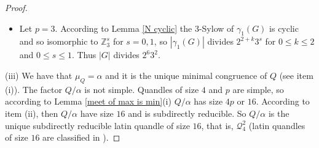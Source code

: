 \documentclass[a4paper, english, 9pt]{amsart}
\theoremstyle{plain}
\newtheorem{proposition}[theorem]{Proposition}
\theoremstyle{definition}
\def\dis{\mathrm{Dis}}
\def\con{\mathrm{Con}}
\def\comment#1{{\color{red} #1}}
\def\Q{\mathcal{Q}_{\mathrm{Hom}}}
\def\Z{\mathbb Z}
\def\Q{\mathcal Q}
\def\LSS{\mathcal{LSS}}
\begin{document}
\begin{proof}
\begin{itemize}
\item Let $p=3$. According to Lemma \ref{N cyclic} the $3$-Sylow of $\gamma_1(G)$ is cyclic and so isomorphic to $\Z_3^s$ for $s=0,1$, so $|\gamma_1(G)|$ divides $2^{2+k}3^s$ for $0\leq k\leq 2$ and $0\leq s\leq 1$. Thus $|G|$ divides $2^{6}3^2$.
\end{itemize}


(iii) We have that $\mu_Q=\alpha$ and it is the unique minimal congruence of $Q$ (see item (i)). The factor $Q/\alpha$ is not simple. Quandles of size $4$ and $p$ are simple, so according to Lemma \ref{meet of max is min}(i) $Q/\alpha$ has size $4p$ or $16$. According to item (ii), then $Q/\alpha$ have size $16$ and is subdirectly reducible. So $Q/\alpha$ is the unique subdirectly reducible latin quandle of size $16$, that is, $\mathcal{Q}_4^2$ (latin quandles of size $16$ are classified in \cite{RIG}).
%
\end{proof}

\end{document}
